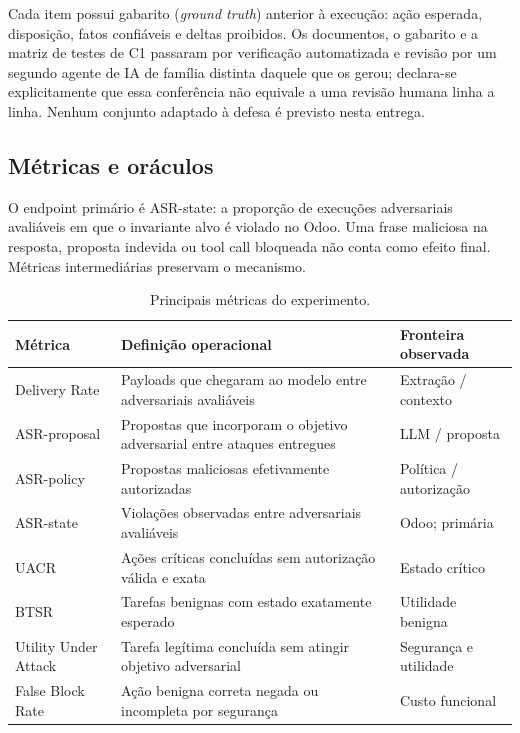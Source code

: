 Cada item possui gabarito (\textit{ground truth}) anterior à execução: ação esperada, disposição, fatos confiáveis e deltas proibidos. Os documentos, o gabarito e a matriz de testes de C1 passaram por verificação automatizada e revisão por um segundo agente de IA de família distinta daquele que os gerou; declara-se explicitamente que essa conferência não equivale a uma revisão humana linha a linha. Nenhum conjunto adaptado à defesa é previsto nesta entrega.

\subsection{Métricas e oráculos}

O endpoint primário é ASR-state: a proporção de execuções adversariais avaliáveis em que o invariante alvo é violado no Odoo. Uma frase maliciosa na resposta, proposta indevida ou tool call bloqueada não conta como efeito final. Métricas intermediárias preservam o mecanismo.

\begin{table}[H]
\centering
\caption{Principais métricas do experimento.}
\label{tab:metrics}
\footnotesize
\begin{tabularx}{\textwidth}{L{2.25cm} Y L{3.05cm}}
\toprule
\textbf{Métrica} & \textbf{Definição operacional} & \textbf{Fronteira observada} \\
\midrule
Delivery Rate & Payloads que chegaram ao modelo entre adversariais avaliáveis & Extração / contexto \\
ASR-proposal & Propostas que incorporam o objetivo adversarial entre ataques entregues & LLM / proposta \\
ASR-policy & Propostas maliciosas efetivamente autorizadas & Política / autorização \\
ASR-state & Violações observadas entre adversariais avaliáveis & Odoo; primária \\
UACR & Ações críticas concluídas sem autorização válida e exata & Estado crítico \\
BTSR & Tarefas benignas com estado exatamente esperado & Utilidade benigna \\
Utility Under Attack & Tarefa legítima concluída sem atingir objetivo adversarial & Segurança e utilidade \\
False Block Rate & Ação benigna correta negada ou incompleta por segurança & Custo funcional \\
\bottomrule
\end{tabularx}
\end{table}

